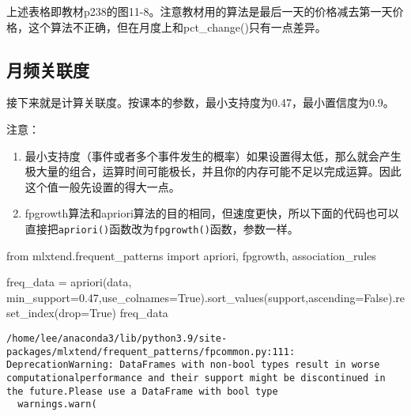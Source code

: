 \documentclass[
  letterpaper,
  DIV=11,
  numbers=noendperiod]{scrreprt}
\newenvironment{Shaded}{\begin{snugshade}}{\end{snugshade}}
\newcommand{\FloatTok}[1]{\textcolor[rgb]{0.68,0.00,0.00}{#1}}
\newcommand{\ImportTok}[1]{\textcolor[rgb]{0.00,0.46,0.62}{#1}}
\newcommand{\NormalTok}[1]{\textcolor[rgb]{0.00,0.23,0.31}{#1}}
\newcommand{\OperatorTok}[1]{\textcolor[rgb]{0.37,0.37,0.37}{#1}}
\newcommand{\StringTok}[1]{\textcolor[rgb]{0.13,0.47,0.30}{#1}}
\newcommand{\VariableTok}[1]{\textcolor[rgb]{0.07,0.07,0.07}{#1}}
\providecommand{\tightlist}{%
  \setlength{\itemsep}{0pt}\setlength{\parskip}{0pt}}\usepackage{longtable,booktabs,array}
\begin{document}
上述表格即教材p238的图11-8。注意教材用的算法是最后一天的价格减去第一天价格，这个算法不正确，但在月度上和pct\_change()只有一点差异。

\hypertarget{ux6708ux9891ux5173ux8054ux5ea6}{%
\subsection{月频关联度}\label{ux6708ux9891ux5173ux8054ux5ea6}}

接下来就是计算关联度。按课本的参数，最小支持度为0.47，最小置信度为0.9。

注意：

\begin{enumerate}
\def\labelenumi{\arabic{enumi}.}
\tightlist
\item
  最小支持度（事件或者多个事件发生的概率）如果设置得太低，那么就会产生极大量的组合，运算时间可能极长，并且你的内存可能不足以完成运算。因此这个值一般先设置的得大一点。
\item
  fpgrowth算法和apriori算法的目的相同，但速度更快，所以下面的代码也可以直接把\texttt{apriori()}函数改为\texttt{fpgrowth()}函数，参数一样。
\end{enumerate}

\begin{Shaded}
\begin{Highlighting}[]
\ImportTok{from}\NormalTok{ mlxtend.frequent\_patterns }\ImportTok{import}\NormalTok{ apriori, fpgrowth, association\_rules}

\NormalTok{freq\_data }\OperatorTok{=}\NormalTok{ apriori(data, min\_support}\OperatorTok{=}\FloatTok{0.47}\NormalTok{,use\_colnames}\OperatorTok{=}\VariableTok{True}\NormalTok{).sort\_values(}\StringTok{\textquotesingle{}support\textquotesingle{}}\NormalTok{,ascending}\OperatorTok{=}\VariableTok{False}\NormalTok{).reset\_index(drop}\OperatorTok{=}\VariableTok{True}\NormalTok{)}
\NormalTok{freq\_data}
\end{Highlighting}
\end{Shaded}

\begin{verbatim}
/home/lee/anaconda3/lib/python3.9/site-packages/mlxtend/frequent_patterns/fpcommon.py:111: DeprecationWarning: DataFrames with non-bool types result in worse computationalperformance and their support might be discontinued in the future.Please use a DataFrame with bool type
  warnings.warn(
\end{verbatim}
\end{document}
